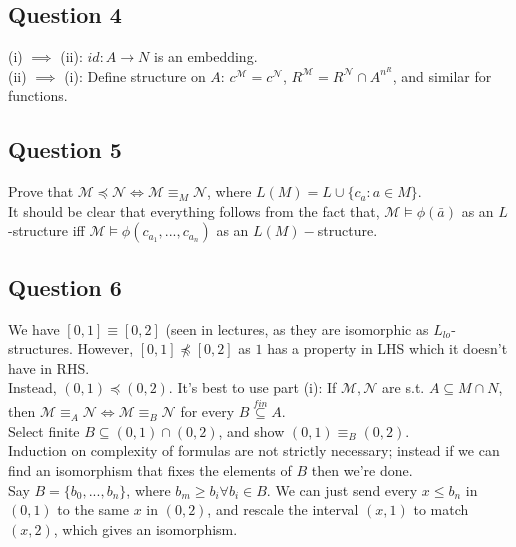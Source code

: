 \documentclass[a4paper]{article}
\begin{document}
\subsection{Question 4}
(i) $\implies$ (ii): $id: A \to N$ is an embedding.\\
(ii) $\implies$ (i): Define structure on $A$: $c^{\mathcal{M}} = c^{\mathcal{N}}$, $R^{\mathcal{M}} = R^{\mathcal{N}} \cap A^{n^R}$, and similar for functions.

\subsection{Question 5}
Prove that $\mathcal{M} \preccurlyeq \mathcal{N} \iff \mathcal{M} \equiv_M \mathcal{N}$, where $L(M) = L \cup \{c_a: a \in M\}$.\\
It should be clear that everything follows from the fact that, $\mathcal{M} \vDash \phi(\bar{a})$ as an $L$-structure iff $\mathcal{M} \vDash \phi(c_{a_1},...,c_{a_n})$ as an $L(M)-$structure.

\subsection{Question 6}
We have $[0,1] \equiv [0,2]$ (seen in lectures, as they are isomorphic as $L_{lo}$-structures. However, $[0,1] \not\preccurlyeq [0,2]$ as $1$ has a property in LHS which it doesn't have in RHS.\\
Instead, $(0,1) \preccurlyeq (0,2)$. It's best to use part (i): If $\mathcal{M},\mathcal{N}$ are s.t. $A \subseteq M \cap N$, then $\mathcal{M} \equiv_A \mathcal{N} \iff \mathcal{M} \equiv_B \mathcal{N}$ for every $B \stackrel{fin}{\subseteq} A$.\\
Select finite $B \subseteq (0,1) \cap (0,2)$, and show $(0,1) \equiv_B (0,2)$.\\
Induction on complexity of formulas are not strictly necessary; instead if we can find an isomorphism that fixes the elements of $B$ then we're done.\\
Say $B =\{b_0,...,b_n\}$, where $b_m \geq b_i \forall b_i \in B$. We can just send every $x \leq b_n$ in $(0,1)$ to the same $x$ in $(0,2)$, and rescale the interval $(x,1)$ to match $(x,2)$, which gives an isomorphism.\\
\end{document}
